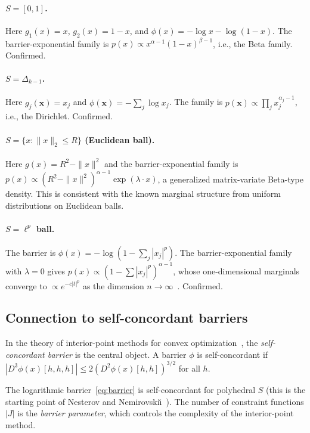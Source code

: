 \documentclass[aps,pre,twocolumn,superscriptaddress,nofootinbib]{revtex4-2}
\theoremstyle{definition}
\theoremstyle{remark}
\begin{document}
\paragraph{$S=[0,1]$.}  Here $g_1(x)=x$, $g_2(x)=1{-}x$, and
$\phi(x)=-\log x-\log(1{-}x)$.  The barrier-exponential family is
$p(x)\propto x^{\alpha-1}(1{-}x)^{\beta-1}$, i.e., the Beta family.
Confirmed.

\paragraph{$S=\Delta_{k-1}$.}  Here $g_j(\bm{x})=x_j$ and $\phi(\bm{x})=-\sum_j\log x_j$.
The family is $p(\bm{x})\propto\prod_j x_j^{\alpha_j-1}$, i.e., the Dirichlet.  Confirmed.

\paragraph{$S=\{x:\|x\|_2\le R\}$ (Euclidean ball).}  Here $g(x)=R^2-\|x\|^2$ and the
barrier-exponential family is
$p(x)\propto(R^2-\|x\|^2)^{\alpha-1}\exp(\lambda\cdot x)$, a generalized
matrix-variate Beta-type density.  This is consistent with the known marginal
structure from uniform distributions on Euclidean balls.

\paragraph{$S=\ell^p$ ball.}  The barrier is
$\phi(x)=-\log(1-\sum_j|x_j|^p)$.  The barrier-exponential family with
$\lambda=0$ gives $p(x)\propto(1-\sum|x_j|^p)^{\alpha-1}$, whose
one-dimensional marginals converge to $\propto e^{-c|t|^p}$ as the dimension
$n\to\infty$~\cite{Barthe2005}.  Confirmed.

\subsection{Connection to self-concordant barriers}

In the theory of interior-point methods for convex
optimization~\cite{NesterovNemirovskii1994}, the \emph{self-concordant barrier}
is the central object. A barrier $\phi$ is self-concordant if
$|D^3\phi(x)[h,h,h]|\le 2(D^2\phi(x)[h,h])^{3/2}$ for all $h$.

The logarithmic barrier~\eqref{eq:barrier} is self-concordant for polyhedral
$S$ (this is the starting point of Nesterov and
Nemirovski{\u\i}~\cite{NesterovNemirovskii1994}).  The number of constraint
functions $|J|$ is the \emph{barrier parameter}, which controls the complexity
of the interior-point method.
\end{document}
